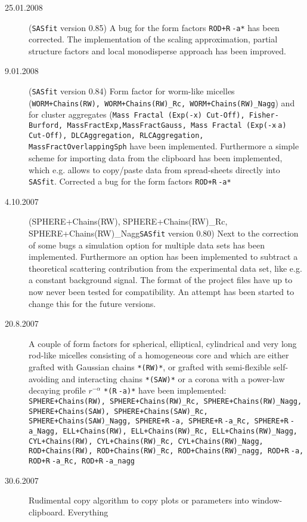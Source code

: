 \begin{description}
    \item[25.01.2008] ({\tt SASfit} version 0.85)
    A bug for the form factors  \texttt{ROD+R$\hat{~}$-a*} has
    been corrected. The implementation of the scaling
    approximation, partial structure factors and local monodisperse
    approach has been improved.
    \item[9.01.2008] ({\tt SASfit} version 0.84) Form factor for
    worm-like micelles (\texttt{WORM+Chains(RW), WORM+Chains(RW)\_Rc,
    WORM+Chains(RW)\_Nagg}) and for cluster aggregates
    (\texttt{Mass Fractal (Exp(-x) Cut-Off), Fisher-Burford,
    MassFractExp,MassFractGauss, Mass Fractal (Exp(-x$\hat{~}$a) Cut-Off), DLCAggregation,
    RLCAggregation, MassFractOverlappingSph} have been implemented. Furthermore a simple scheme for importing data
    from the clipboard has been implemented, which e.g. allows to copy/paste
    data from spread-sheets directly into {\tt SASfit}.
    Corrected a bug for the form factors  \texttt{ROD+R$\hat{~}$-a*}
    \item[4.10.2007] ({SPHERE+Chains(RW), SPHERE+Chains(RW)\_Rc, SPHERE+Chains(RW)\_Nagg\tt SASfit} version 0.80)
    Next to the correction of some bugs a simulation option for
    multiple data sets has been implemented. Furthermore an option has been implemented to subtract a
    theoretical scattering contribution from the experimental data set, like e.g. a constant background signal.
    The format of the project files have up to now never been tested for compatibility. An attempt has
    been started to change this for the future versions.
    \item[20.8.2007] A couple of form factors for spherical, elliptical, cylindrical and very long rod-like
    micelles consisting of a homogeneous core and which are either grafted with Gaussian chains \texttt{*(RW)*},
    or grafted with semi-flexible self-avoiding and interacting chains \texttt{*(SAW)*} or
    a corona with a power-law decaying profile $r^{-\alpha}$ \texttt{*(R$\hat{~}$-a)*}
    have been implemented:
    \texttt{
    SPHERE+Chains(RW), SPHERE+Chains(RW)\_Rc, SPHERE+Chains(RW)\_Nagg,
    SPHERE+Chains(SAW), SPHERE+Chains(SAW)\_Rc, SPHERE+Chains(SAW)\_Nagg,
    SPHERE+R$\hat{~}$-a, SPHERE+R$\hat{~}$-a\_Rc, SPHERE+R$\hat{~}$-a\_Nagg,
    ELL+Chains(RW), ELL+Chains(RW)\_Rc, ELL+Chains(RW)\_Nagg,
    CYL+Chains(RW), CYL+Chains(RW)\_Rc, CYL+Chains(RW)\_Nagg,
    ROD+Chains(RW), ROD+Chains(RW)\_Rc, ROD+Chains(RW)\_nagg,
    ROD+R$\hat{~}$-a, ROD+R$\hat{~}$-a\_Rc, ROD+R$\hat{~}$-a\_nagg
    }
    \item[30.6.2007] Rudimental copy algorithm to copy plots or parameters into window-clipboard. Everything

\end{description}
